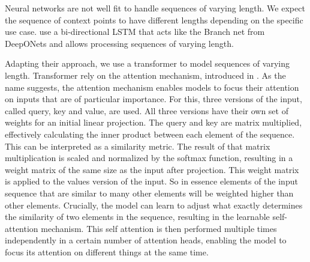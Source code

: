 Neural networks are not well fit to handle sequences of varying length. We expect the sequence of context points to have different lengths depending on the specific use case. \citet{seifner2025zeroshotimputationfoundationinference} use a bi-directional LSTM that acts like the Branch net from DeepONets and allows processing sequences of varying length. 

Adapting their approach, we use a transformer to model sequences of varying length. Transformer rely on the attention mechanism, introduced in \citet{vaswani2017attention}. As the name suggests, the attention mechanism enables models to focus their attention on inputs that are of particular importance. For this, three versions of the input, called query, key and value, are used. All three versions have their own set of weights for an initial linear projection. The query and key are matrix multiplied, effectively calculating the inner product between each element of the sequence. This can be interpreted as a similarity metric. The result of that matrix multiplication is scaled and normalized by the softmax function, resulting in a weight matrix of the same size as the input after projection. This weight matrix is applied to the values version of the input. So in essence elements of the input sequence that are similar to many other elements will be weighted higher than other elements. Crucially, the model can learn to adjust what exactly determines the similarity of two elements in the sequence, resulting in the learnable self-attention mechanism. This self attention is then performed multiple times independently in a certain number of attention heads, enabling the model to focus its attention on different things at the same time. \cite{vaswani2017attention}